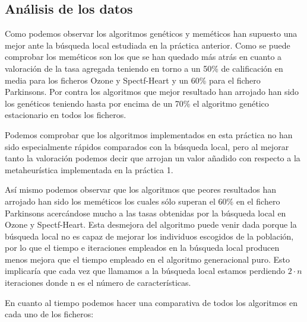 \documentclass[12pt,a4paper]{article}
\begin{document}
	\newpage
	
	\subsection{Análisis de los datos}
	
	Como podemos observar los algoritmos genéticos y meméticos han supuesto una mejor ante la búsqueda local estudiada en la práctica anterior. Como se puede comprobar los meméticos son los que se han quedado más atrás en cuanto a valoración de la tasa agregada teniendo en torno a un 50\% de calificación en media para los ficheros Ozone y Spectf-Heart y un 60\% para el fichero Parkinsons. Por contra los algoritmos que mejor resultado han arrojado han sido los genéticos teniendo hasta por encima de un 70\% el algoritmo genético estacionario en todos los ficheros. 
	
	Podemos comprobar que los algoritmos implementados en esta práctica no han sido especialmente rápidos comparados con la búsqueda local, pero al mejorar tanto la valoración podemos decir que arrojan un valor añadido con respecto a la metaheurística implementada en la práctica 1.
	
	Así mismo podemos observar que los algoritmos que peores resultados han arrojado han sido los meméticos los cuales sólo superan el 60\% en el fichero Parkinsons acercándose mucho a las tasas obtenidas por la búsqueda local en Ozone y Spectf-Heart. Esta desmejora del algoritmo puede venir dada porque la búsqueda local no es capaz de mejorar los individuos escogidos de la población, por lo que el tiempo e iteraciones empleados en la búsqueda local producen menos mejora que el tiempo empleado en el algoritmo generacional puro. Esto implicaría que cada vez que llamamos a la búsqueda local estamos perdiendo $2\cdot n$ iteraciones donde n es el número de características.
	
	En cuanto al tiempo podemos hacer una comparativa de todos los algoritmos en cada uno de los ficheros:
	
\end{document}
